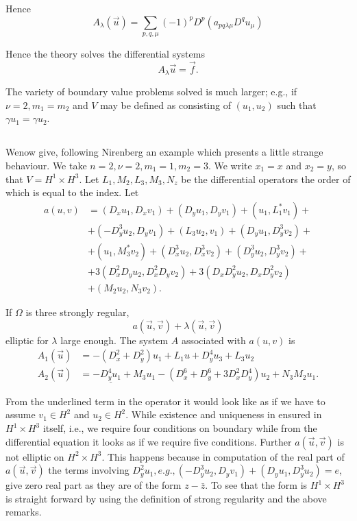 Hence 
$$
A_\lambda (\overset{\to}u) = \sum\limits_{p, q, \mu} (-1)^p D^p (a_{pq
  \lambda \mu } D^q u_\mu) 
$$

Hence the theory solves the differential systems
$$
A_\lambda \overset{\to}u = \overset{\to}f.
$$

The variety of boundary value problems solved is much larger; e.g., if
$\nu = 2, m_1 = m_2$ and $V$ may be defined as consisting of $(u_1,
u_2)$ such that $\gamma u_1 = \gamma u_2$. 

\subsection{}\label{lec25:sec14:subsec2} %

We\pageoriginale now give, following Nirenberg \cite{k13} an
example which presents a little strange  behaviour. We take $n = 2, \nu
=2, m_1 =1, m_2 = 3$. We write $x_1 =x$ and $x_2 = y$, so that $V =
H^1 \times H^3$. Let $L_1, M_2, L_3, M_3, N_z$ be the differential
operators the order of which is equal to the index. Let 
\begin{align*}
  a(u, v) & = (D_x u_1, D_x v_1) + (D_y u_1, D_y v_1) + (u_1, L^{*}_{1} v_1) +\\
  & + (-D^3_y u_2, D_y v_1) + (L_3 u_2, v_1) + (D_y u_1, D^3_y v_2) + \\
  & + (u_1, M_3^* v_2) + (D^3_x u_2, D^3_{x} v_2) + (D^{3}_y u_2, D^{3}_{y} v_2) +\\
  & + 3 (D^2_x D_y u_2, D^2_x D_y v_2) + 3 (D_x D^2_y u_2, D_x D^2_y v_2)\\
  & + (M_2 u_2, N_3 v_2).
\end{align*}

\begin{lemma}\label{lec25:sec14:subsec2:lem14.1}%
  If $\Omega$ is three strongly regular,
  $$
  a ( \overset{\to}u , \overset{\to}v) + \lambda (\overset{\to}u ,
  \overset{\to}v)  
  $$
  elliptic for $\lambda$ large enough. The system $A$ associated with $a(u,v)$  is 
  \begin{align*}
    A_1 (\overset{\to}u) & = - (D^2_x + D^2_y) u_1 + L_1 u + D^4_y u_3 + L_3 u_2\\
    A_2 (\overset{\to}u) & = - \underline{D^4_y u_1} + M_3 u_1 - (D^6_x +
    D^6_y + 3D^2_x D^4_y) u_2 + N_3 M_2 u_1.   
  \end{align*}
\end{lemma} 

From the underlined term in the operator it would look like as if we
have to assume $v_1 \in H^2$ and $u_2 \in H^2$. While
existence and uniqueness in ensured in $H^1 \times H^3$ itself, i.e.,
we require four conditions on boundary while from the differential
equation it looks as if we require five conditions. Further
$a(\overset{\to}u, \overset{\to}v)$ is not elliptic on $H^2 \times
H^3$. This happens because in computation of the real part of
$a(\overset{\to}u, \overset{\to}v)$ the terms involving $D^{2}_{y}
u_1, e.g., (-D^3_y u_2, D_y v_1) + (D_y u_1, D^3_y u_2) = e$, give
zero real part as they are of the form $z - \bar{z}$. To see that the
form is $H^1 \times H^3$ is straight forward by using the definition
of strong regularity and the above remarks. 

